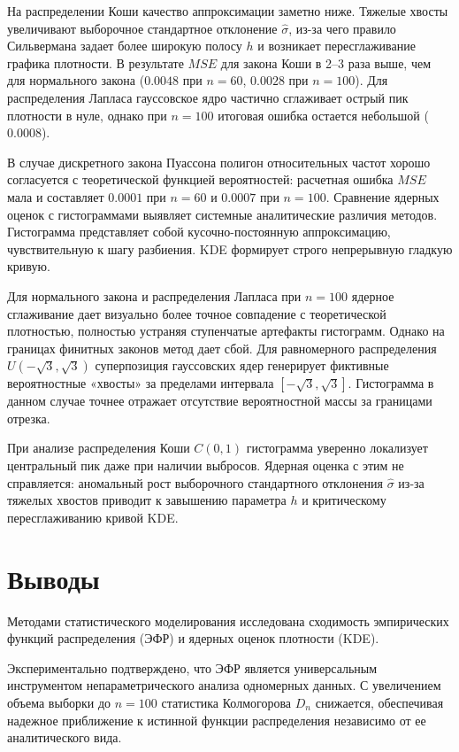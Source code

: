 \documentclass[a4paper, 14pt]{extarticle}
\begin{document}
На распределении Коши качество аппроксимации заметно ниже. Тяжелые хвосты увеличивают выборочное стандартное отклонение $\hat{\sigma}$, из-за чего правило Сильвермана задает более широкую полосу $h$ и возникает пересглаживание графика плотности. В результате $MSE$ для закона Коши в 2--3 раза выше, чем для нормального закона ($0.0048$ при $n=60$, $0.0028$ при $n=100$). Для распределения Лапласа гауссовское ядро частично сглаживает острый пик плотности в нуле, однако при $n=100$ итоговая ошибка остается небольшой ($0.0008$). 

В случае дискретного закона Пуассона полигон относительных частот хорошо согласуется с теоретической функцией вероятностей: расчетная ошибка $MSE$ мала и составляет $0.0001$ при $n=60$ и $0.0007$ при $n=100$. 
Сравнение ядерных оценок с гистограммами выявляет системные аналитические различия методов. Гистограмма представляет собой кусочно-постоянную аппроксимацию, чувствительную к шагу разбиения. KDE формирует строго непрерывную гладкую кривую. 

Для нормального закона и распределения Лапласа при $n=100$ ядерное сглаживание дает визуально более точное совпадение с теоретической плотностью, полностью устраняя ступенчатые артефакты гистограмм. Однако на границах финитных законов метод дает сбой. Для равномерного распределения $U(-\sqrt{3}, \sqrt{3})$ суперпозиция гауссовских ядер генерирует фиктивные вероятностные «хвосты» за пределами интервала $[-\sqrt{3}, \sqrt{3}]$. Гистограмма в данном случае точнее отражает отсутствие вероятностной массы за границами отрезка. 

При анализе распределения Коши $C(0, 1)$ гистограмма уверенно локализует центральный пик даже при наличии выбросов. Ядерная оценка с этим не справляется: аномальный рост выборочного стандартного отклонения $\hat{\sigma}$ из-за тяжелых хвостов приводит к завышению параметра $h$ и критическому пересглаживанию кривой KDE.


\section{Выводы}

Методами статистического моделирования исследована сходимость эмпирических функций распределения (ЭФР) и ядерных оценок плотности (KDE).

Экспериментально подтверждено, что ЭФР является универсальным инструментом непараметрического анализа одномерных данных. С увеличением объема выборки до $n=100$ статистика Колмогорова $D_n$ снижается, обеспечивая надежное приближение к истинной функции распределения независимо от ее аналитического вида.
\end{document}
